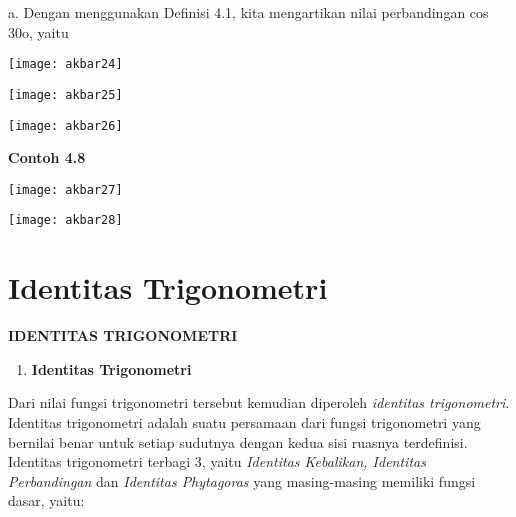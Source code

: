 \documentclass[11pt,fleqn]{book} %
\begin{document}
\begin{myEnumerate}
\begin{itemize}
\noindent a. Dengan menggunakan Definisi 4.1, kita mengartikan nilai perbandingan cos 30o, yaitu

\noindent \texttt{[image: akbar24]}

\noindent 

\noindent 

\noindent 

\noindent 

\noindent 

 

\noindent 

\noindent 

\noindent 

\noindent 

\noindent 

\noindent 

\noindent \texttt{[image: akbar25]}

\noindent \eject 

\noindent \texttt{[image: akbar26]}

\noindent \textbf{Contoh 4.8}

\noindent \texttt{[image: akbar27]}

\noindent \texttt{[image: akbar28]}

\noindent 


\section{Identitas Trigonometri}

\noindent \textbf{IDENTITAS TRIGONOMETRI}

\begin{enumerate}
\item \textbf{ Identitas Trigonometri}
\end{enumerate}

Dari nilai fungsi trigonometri tersebut kemudian diperoleh \textit{identitas trigonometri}. Identitas trigonometri adalah suatu persamaan dari fungsi trigonometri yang bernilai benar untuk setiap sudutnya dengan kedua sisi ruasnya terdefinisi. Identitas trigonometri terbagi 3, yaitu \textit{Identitas Kebalikan, Identitas Perbandingan }dan\textit{ Identitas Phytagoras} yang masing-masing memiliki fungsi dasar, yaitu:


\end{itemize}
\end{myEnumerate}
\end{document}
